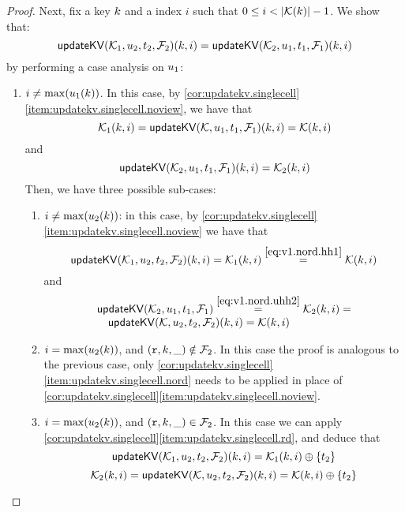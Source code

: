 \begin{proof}
Next, fix a key $k$ and a index $i$ such that $0 \leq i < \lvert  \mathcal{K}(k)  \rvert - 1$. 
We show that:
\[ 
    \mathsf{updateKV}(\mathcal{K}_1,u_2,t_2,\mathcal{F}_2)(k, i) = \mathsf{updateKV}(\mathcal{K}_2, u_1, t_1, \mathcal{F}_1)(k, i)
\]
by performing a case analysis on $u_1$: 
\begin{enumerate}
\item $i \neq \max(u_1(k))$. 
In this case, by \cref{cor:updatekv.singlecell}\cref{item:updatekv.singlecell.noview}, 
we have that 
\begin{equation}
\mathcal{K}_1(k, i) = \mathsf{updateKV}(\mathcal{K}, u_1, t_1, \mathcal{F}_1)(k, i) = \mathcal{K}(k, i)
\label{eq:v1.nord.hh1}
\end{equation}
and 
\begin{equation}
\mathsf{updateKV}(\mathcal{K}_2, u_1, t_1, \mathcal{F}_1)(k, i) = \mathcal{K}_2(k, i)
\label{eq:v1.nord.uhh2}
\end{equation}
Then, we have three possible sub-cases: 
\begin{enumerate}
\item $i \neq \max(u_2(k))$: in this case, by \cref{cor:updatekv.singlecell}\cref{item:updatekv.singlecell.noview} we have that 
\[\updateKV(\hh_1, \vi_2, \txid_2, \opset_2)(\ke, i) = 
\hh_1(\ke, i) \stackrel{\cref{eq:v1.nord.hh1}}{=} \hh(\ke, i)
\]
and
\[
\begin{array}{l}
\updateKV(\hh_2, \vi_1, \txid_1, \opset_1) \stackrel{\cref{eq:v1.nord.uhh2}}{=} \hh_2(\ke,i) = \\
\quad \updateKV(\hh, \vi_2, \txid_2, \opset_2)(\ke, i) = \hh(\ke, i)
\end{array}
\]
\item $i = \max(u_2(k))$, and $(\textnormal{\texttt r}, k, \_) \notin \mathcal{F}_2$. In this case the proof is analogous to the previous case, 
only \cref{cor:updatekv.singlecell}\cref{item:updatekv.singlecell.nord} needs to be applied in place 
of \cref{cor:updatekv.singlecell}\cref{item:updatekv.singlecell.noview}.
\item $i = \max(u_2(k))$, and $(\textnormal{\texttt r}, k, \_) \in \mathcal{F}_2$. In this case we can apply \cref{cor:updatekv.singlecell}\cref{item:updatekv.singlecell.rd}, 
and deduce that 
\begin{equation}
\mathsf{updateKV}(\mathcal{K}_1, u_2, t_2, \mathcal{F}_2)(k, i) = \mathcal{K}_1(k, i) \oplus \{t_2\}
\label{eq:v1.nord.v2.rd.uhh1}
\end{equation}
\begin{equation}
\mathcal{K}_2(k, i) = \mathsf{updateKV}(\mathcal{K}, u_2, t_2, \mathcal{F}_2)(k, i) = \mathcal{K}(k,i) \oplus \{t_2\}
\label{eq:v1.nord.v2.rd.hh2}
\end{equation}

\end{enumerate}
\end{enumerate}
\end{proof}
